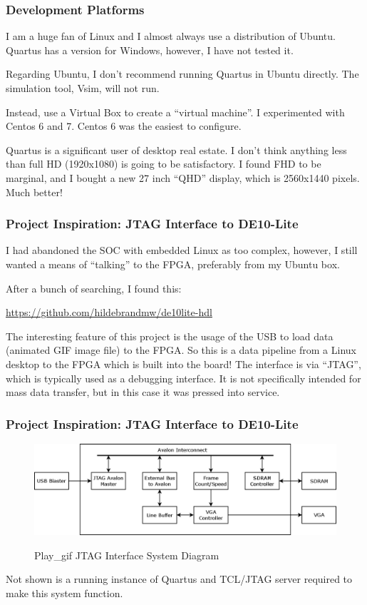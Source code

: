 \documentclass{beamer}
\begin{document}
\begin{frame}
\frametitle{Development Platforms}

I am a huge fan of Linux and I almost always use a distribution of Ubuntu.
Quartus has a version for Windows, however, I have not tested it.

Regarding Ubuntu, I don't recommend running Quartus in Ubuntu directly.  The simulation tool, Vsim, will not run.

Instead, use a Virtual Box to create a ``virtual machine''.  I experimented with Centos 6 and 7.  Centos 6 was the easiest to configure.

Quartus is a significant user of desktop real estate.  I don't think anything less than full HD (1920x1080) is going to be satisfactory.  I found FHD to be marginal, and I bought a new 27 inch ``QHD'' display, which is 2560x1440 pixels.  Much better!

\end{frame}

\begin{frame}
\frametitle{Project Inspiration:  JTAG Interface to DE10-Lite}

I had abandoned the SOC with embedded Linux as too complex, however, I still wanted a means of ``talking'' to the FPGA, preferably from my Ubuntu box.

After a bunch of searching, I found this:

\url{https://github.com/hildebrandmw/de10lite-hdl}

The interesting feature of this project is the usage of the USB to load data (animated GIF image file) to
the FPGA. So this is a data pipeline from a Linux desktop to the FPGA which is built into the board!
The interface is via “JTAG”, which is typically used as a debugging interface. It is not specifically intended
for mass data transfer, but in this case it was pressed into service.

\end{frame}

\begin{frame}
\frametitle{Project Inspiration:  JTAG Interface to DE10-Lite}

\begin{figure}[h]
	\centering
	\includegraphics[width=1.0\textwidth]{graphics/play_gif.png}
	\centering\bfseries
	\caption{Play\_gif JTAG Interface System Diagram}
\end{figure}

Not shown is a running instance of Quartus and TCL/JTAG server required to make this system function.

\end{frame}
\end{document}
